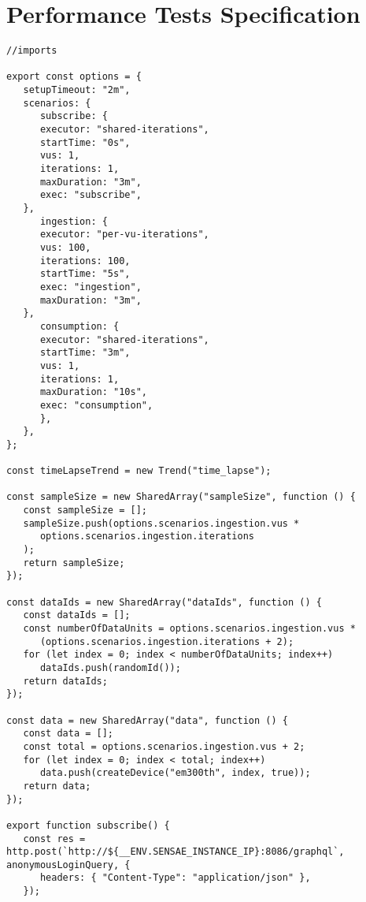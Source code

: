 \chapter{Performance Tests Specification}
\label{AppendixF}

\begin{lstlisting}[style=javascript, caption=Smart Irrigation Performance Test Scenario Description, label={code:AppendixF:scenario1}]
//imports

export const options = {
   setupTimeout: "2m",
   scenarios: {
      subscribe: {
      executor: "shared-iterations",
      startTime: "0s",
      vus: 1,
      iterations: 1,
      maxDuration: "3m",
      exec: "subscribe",
   },
      ingestion: {
      executor: "per-vu-iterations",
      vus: 100,
      iterations: 100,
      startTime: "5s",
      exec: "ingestion",
      maxDuration: "3m",
   },
      consumption: {
      executor: "shared-iterations",
      startTime: "3m",
      vus: 1,
      iterations: 1,
      maxDuration: "10s",
      exec: "consumption",
      },
   },
};

const timeLapseTrend = new Trend("time_lapse");

const sampleSize = new SharedArray("sampleSize", function () {
   const sampleSize = [];
   sampleSize.push(options.scenarios.ingestion.vus * 
      options.scenarios.ingestion.iterations
   );
   return sampleSize;
});

const dataIds = new SharedArray("dataIds", function () {
   const dataIds = [];
   const numberOfDataUnits = options.scenarios.ingestion.vus *
      (options.scenarios.ingestion.iterations + 2);
   for (let index = 0; index < numberOfDataUnits; index++)
      dataIds.push(randomId());
   return dataIds;
});

const data = new SharedArray("data", function () {
   const data = [];
   const total = options.scenarios.ingestion.vus + 2;
   for (let index = 0; index < total; index++)
      data.push(createDevice("em300th", index, true));
   return data;
});

export function subscribe() {
   const res = http.post(`http://${__ENV.SENSAE_INSTANCE_IP}:8086/graphql`, anonymousLoginQuery, {
      headers: { "Content-Type": "application/json" },
   });


\end{lstlisting}
